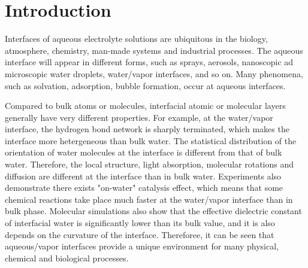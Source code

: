 \chapter{Introduction}\label{CHAPTER_1}

Interfaces of aqueous electrolyte solutions are ubiquitous in the biology, atmosphere, chemistry, man-made systems 
and industrial processes\cite{Irwin88,Tobias99, Benderskii00, 
Asahi01,Benderskii02,Richmond02,LiuH04,
TianCS08,Yamamoto2008, Salmeron2009,ZhangLY09,
LoNostro2012,Piatkowski2014,Balajka2018}.
The aqueous interface will appear in different forms, such as sprays, aerosols, nanoscopic ad  microscopic water droplets, water/vapor interfaces, and so on.
Many phenomena, such as solvation\cite{Benjamin1996}, adsorption\cite{Chang06}, bubble formation\cite{Craig1993,Craig1993b,Weissenborn1995,Marcelja04,Craig04},
occur at aqueous interfaces\cite{Ball2008,Kuo2004b}. 

Compared to bulk atoms or molecules, interfacial atomic or molecular layers generally have very different properties. 
For example, at the water/vapor interface, the hydrogen bond network is sharply terminated, which makes the interface more hetergeneous 
than bulk water\cite{singh2013}. 
The statistical distribution of the orientation of water molecules at the interface is different from that of bulk water.
Therefore, the local structure, light absorption,  molecular rotations and diffusion are different at the interface than in bulk water\cite{Jedlovszky2004}.
Experiments also demonstrate there exists "on-water" catalysis effect, which means that some chemical reactions take place much faster at the water/vapor 
interface than in bulk phase\cite{Rideout1980,Narayan2005,Beattie2010}.
Molecular simulations also show that the effective dielectric constant of interfacial water is significantly lower than its bulk value, 
and it is also depends on the curvature of the interface\cite{Dinpajooh2016}. 
Thereforee, it can be seen that aqueous/vapor interfaces provide a unique environment for many physical, chemical and biological processes. 


